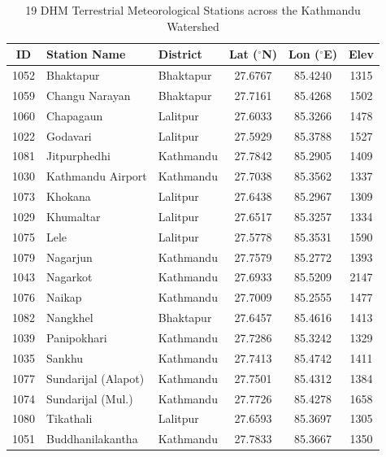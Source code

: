 \documentclass[conference]{IEEEtran}
\begin{document}
\begin{table}[!htbp]
\centering
\caption{19 DHM Terrestrial Meteorological Stations across the Kathmandu Watershed}
\label{tab:stations}
\vspace{3pt}
{\scriptsize
\renewcommand{\arraystretch}{1.10}\setlength{\tabcolsep}{1.5pt}%
\begin{tabularx}{\columnwidth}{|c|X|l|c|c|c|}
\hline
\textbf{ID} & \textbf{Station Name} & \textbf{District} & \textbf{Lat ($^\circ$N)} & \textbf{Lon ($^\circ$E)} & \textbf{Elev} \\
\hline
1052 & Bhaktapur & Bhaktapur & 27.6767 & 85.4240 & 1315 \\ \hline
1059 & Changu Narayan & Bhaktapur & 27.7161 & 85.4268 & 1502 \\ \hline
1060 & Chapagaun & Lalitpur & 27.6033 & 85.3266 & 1478 \\ \hline
1022 & Godavari & Lalitpur & 27.5929 & 85.3788 & 1527 \\ \hline
1081 & Jitpurphedhi & Kathmandu & 27.7842 & 85.2905 & 1409 \\ \hline
1030 & Kathmandu Airport & Kathmandu & 27.7038 & 85.3562 & 1337 \\ \hline
1073 & Khokana & Lalitpur & 27.6438 & 85.2967 & 1309 \\ \hline
1029 & Khumaltar & Lalitpur & 27.6517 & 85.3257 & 1334 \\ \hline
1075 & Lele & Lalitpur & 27.5778 & 85.3531 & 1590 \\ \hline
1079 & Nagarjun & Kathmandu & 27.7579 & 85.2772 & 1393 \\ \hline
1043 & Nagarkot & Kathmandu & 27.6933 & 85.5209 & 2147 \\ \hline
1076 & Naikap & Kathmandu & 27.7009 & 85.2555 & 1477 \\ \hline
1082 & Nangkhel & Bhaktapur & 27.6457 & 85.4616 & 1413 \\ \hline
1039 & Panipokhari & Kathmandu & 27.7286 & 85.3242 & 1329 \\ \hline
1035 & Sankhu & Kathmandu & 27.7413 & 85.4742 & 1411 \\ \hline
1077 & Sundarijal (Alapot) & Kathmandu & 27.7501 & 85.4312 & 1384 \\ \hline
1074 & Sundarijal (Mul.) & Kathmandu & 27.7726 & 85.4278 & 1658 \\ \hline
1080 & Tikathali & Lalitpur & 27.6593 & 85.3697 & 1305 \\ \hline
1051 & Buddhanilakantha & Kathmandu & 27.7833 & 85.3667 & 1350 \\
\hline
\end{tabularx}%
}
\end{table}
\end{document}
